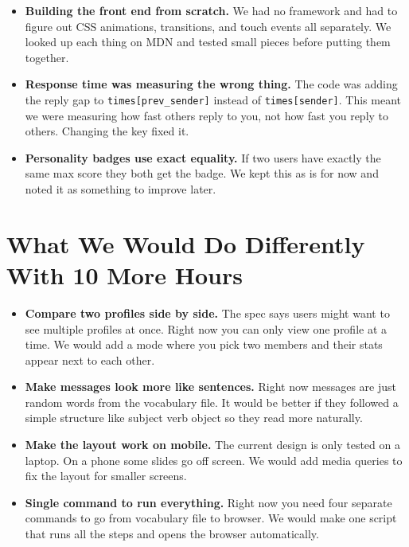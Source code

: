 \documentclass{article}
\begin{document}
\begin{itemize}

\item \textbf{Building the front end from scratch.} We had no framework and had to figure out CSS animations, transitions, and touch events all separately. We looked up each thing on MDN and tested small pieces before putting them together.

\item \textbf{Response time was measuring the wrong thing.} The code was adding the reply gap to \texttt{times[prev\_sender]} instead of \texttt{times[sender]}. This meant we were measuring how fast others reply to you, not how fast you reply to others. Changing the key fixed it.

\item \textbf{Personality badges use exact equality.} If two users have exactly the same max score they both get the badge. We kept this as is for now and noted it as something to improve later.

\end{itemize}

\section{What We Would Do Differently With 10 More Hours}

\begin{itemize}

\item \textbf{Compare two profiles side by side.} The spec says users might want to see multiple profiles at once. Right now you can only view one profile at a time. We would add a mode where you pick two members and their stats appear next to each other.

\item \textbf{Make messages look more like sentences.} Right now messages are just random words from the vocabulary file. It would be better if they followed a simple structure like subject verb object so they read more naturally.

\item \textbf{Make the layout work on mobile.} The current design is only tested on a laptop. On a phone some slides go off screen. We would add media queries to fix the layout for smaller screens.

\item \textbf{Single command to run everything.} Right now you need four separate commands to go from vocabulary file to browser. We would make one script that runs all the steps and opens the browser automatically.

\end{itemize}
\end{document}
